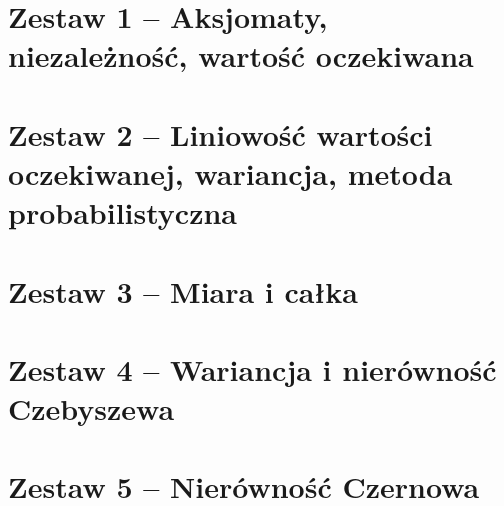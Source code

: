 \documentclass[12pt, a4paper, polish, openany]{book}
\begin{document}
\frontmatter



\tableofcontents


\titleformat{\chapter}[display]{\normalfont\Huge\bfseries}{}{0pt}{\Huge}
\titlespacing*{\chapter}{0pt}{0pt}{20pt}

\setcounter{secnumdepth}{-1}

\mainmatter

\chapter{Zestaw 1 -- Aksjomaty, niezależność, wartość oczekiwana}
\graphicspath{{chapters/zestaw-01/}}


\chapter{Zestaw 2 -- Liniowość wartości oczekiwanej, wariancja, metoda probabilistyczna}
\graphicspath{{chapters/zestaw-02/}}


\chapter{Zestaw 3 -- Miara i całka}
\graphicspath{{chapters/zestaw-03/}}


\chapter{Zestaw 4 -- Wariancja i nierówność Czebyszewa}
\graphicspath{{chapters/zestaw-04/}}


\chapter{Zestaw 5 -- Nierówność Czernowa}
\graphicspath{{chapters/zestaw-05/}}

\end{document}
